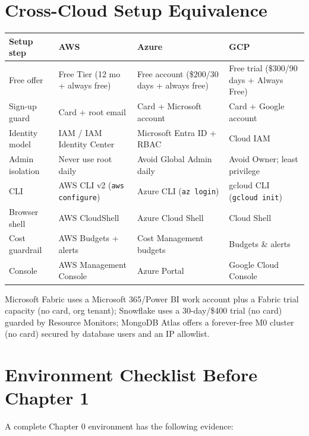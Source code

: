 \section{Cross-Cloud Setup Equivalence}
\begin{crosscloud}
{\footnotesize
\begin{tabular}{@{}p{2.9cm}p{3.0cm}p{3.0cm}p{3.0cm}@{}}
\toprule
\textbf{Setup step} & \textbf{AWS} & \textbf{Azure} & \textbf{GCP} \\
\midrule
Free offer & Free Tier (12 mo + always free) & Free account (\$200/30 days + always free) & Free trial (\$300/90 days + Always Free) \\
Sign-up guard & Card + root email & Card + Microsoft account & Card + Google account \\
Identity model & IAM / IAM Identity Center & Microsoft Entra ID + RBAC & Cloud IAM \\
Admin isolation & Never use root daily & Avoid Global Admin daily & Avoid Owner; least privilege \\
CLI & AWS CLI v2 (\texttt{aws configure}) & Azure CLI (\texttt{az login}) & gcloud CLI (\texttt{gcloud init}) \\
Browser shell & AWS CloudShell & Azure Cloud Shell & Cloud Shell \\
Cost guardrail & AWS Budgets + alerts & Cost Management budgets & Budgets \& alerts \\
Console & AWS Management Console & Azure Portal & Google Cloud Console \\
\bottomrule
\end{tabular}}

Microsoft Fabric uses a Microsoft 365/Power BI work account plus a Fabric trial capacity (no card, org tenant); Snowflake uses a 30-day/\$400 trial (no card) guarded by Resource Monitors; MongoDB Atlas offers a forever-free M0 cluster (no card) secured by database users and an IP allowlist.
\end{crosscloud}

\section{Environment Checklist Before Chapter 1}
A complete Chapter 0 environment has the following evidence:


